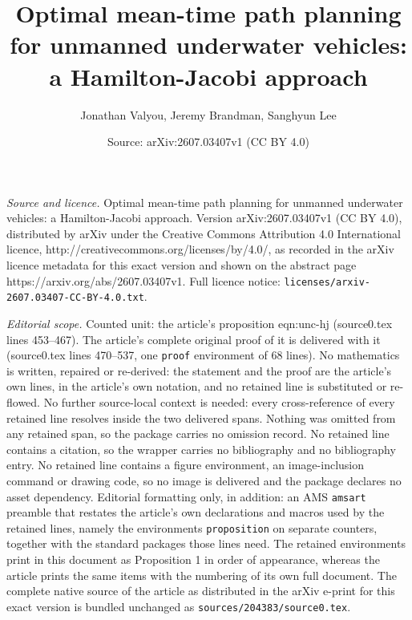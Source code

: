 \documentclass[10pt,a4paper]{amsart}
\title{Optimal mean-time path planning for unmanned underwater vehicles: a Hamilton-Jacobi approach}
\author{Jonathan Valyou, Jeremy Brandman, Sanghyun Lee}
\date{Source: arXiv:2607.03407v1 (CC BY 4.0)}
\begin{document}
\maketitle

\noindent\emph{Source and licence.} Optimal mean-time path planning for unmanned underwater vehicles: a Hamilton-Jacobi approach. Version arXiv:2607.03407v1 (CC BY 4.0), distributed by arXiv under the Creative Commons Attribution 4.0 International licence, http://creativecommons.org/licenses/by/4.0/, as recorded in the arXiv licence metadata for this exact version and shown on the abstract page https://arxiv.org/abs/2607.03407v1. Full licence notice: \texttt{licenses/arxiv-2607.03407-CC-BY-4.0.txt}.\par\smallskip

\noindent\textit{Editorial scope.} Counted unit: the article's proposition eqn:unc-hj (source0.tex lines 453--467). The article's complete original proof of it is delivered with it (source0.tex lines 470--537, one \texttt{proof} environment of 68 lines). No mathematics is written, repaired or re-derived: the statement and the proof are the article's own lines, in the article's own notation, and no retained line is substituted or re-flowed.  No further source-local context is needed: every cross-reference of every retained line resolves inside the two delivered spans.  Nothing was omitted from any retained span, so the package carries no omission record.  No retained line contains a citation, so the wrapper carries no bibliography and no bibliography entry.  No retained line contains a figure environment, an image-inclusion command or drawing code, so no image is delivered and the package declares no asset dependency.  Editorial formatting only, in addition: an AMS \texttt{amsart} preamble that restates the article's own declarations and macros used by the retained lines, namely the environments \texttt{proposition} on separate counters, together with the standard packages those lines need.  The retained environments print in this document as Proposition 1 in order of appearance, whereas the article prints the same items with the numbering of its own full document.  The complete native source of the article as distributed in the arXiv e-print for this exact version is bundled unchanged as \texttt{sources/204383/source0.tex}.
\end{document}
